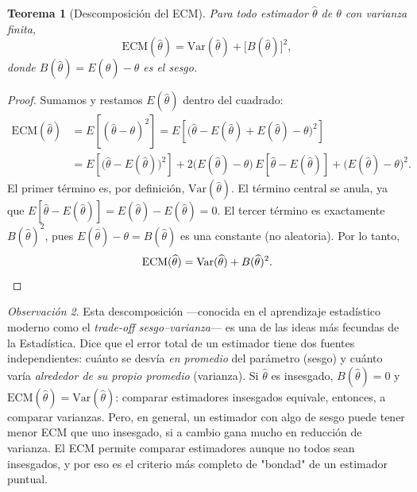 \documentclass[11pt,a4paper]{article}
\theoremstyle{plain}
\newtheorem{teorema}{Teorema}[section]
\theoremstyle{definition}
\theoremstyle{remark}
\newtheorem{observacion}[teorema]{Observación}
\begin{document}
\begin{teorema}[Descomposición del ECM]\label{teo:ecm}
Para todo estimador $\widehat\theta$ de $\theta$ con varianza finita,
\[
\mathrm{ECM}(\widehat\theta) = \mathrm{Var}(\widehat\theta) + \big[B(\widehat\theta)\big]^2,
\]
donde $B(\widehat\theta)=E(\widehat\theta)-\theta$ es el sesgo.
\end{teorema}

\begin{proof}
Sumamos y restamos $E(\widehat\theta)$ dentro del cuadrado:
\begin{align*}
\mathrm{ECM}(\widehat\theta) &= E\left[(\widehat\theta-\theta)^2\right] = E\left[\Big(\widehat\theta - E(\widehat\theta) + E(\widehat\theta)-\theta\Big)^2\right]\\
&= E\left[\big(\widehat\theta-E(\widehat\theta)\big)^2\right] + 2\big(E(\widehat\theta)-\theta\big)\,E\left[\widehat\theta-E(\widehat\theta)\right] + \big(E(\widehat\theta)-\theta\big)^2.
\end{align*}
El primer término es, por definición, $\mathrm{Var}(\widehat\theta)$. El término central se anula, ya que $E[\widehat\theta-E(\widehat\theta)] = E(\widehat\theta)-E(\widehat\theta)=0$. El tercer término es exactamente $B(\widehat\theta)^2$, pues $E(\widehat\theta)-\theta=B(\widehat\theta)$ es una constante (no aleatoria). Por lo tanto,
\[
\mathrm{ECM}(\widehat\theta) = \mathrm{Var}(\widehat\theta) + B(\widehat\theta)^2. \qedhere
\]
\end{proof}

\begin{observacion}
Esta descomposición —conocida en el aprendizaje estadístico moderno como el \emph{trade-off sesgo--varianza}— es una de las ideas más fecundas de la Estadística. Dice que el error total de un estimador tiene dos fuentes independientes: cuánto se desvía \emph{en promedio} del parámetro (sesgo) y cuánto varía \emph{alrededor de su propio promedio} (varianza). Si $\widehat\theta$ es insesgado, $B(\widehat\theta)=0$ y $\mathrm{ECM}(\widehat\theta)=\mathrm{Var}(\widehat\theta)$: comparar estimadores insesgados equivale, entonces, a comparar varianzas. Pero, en general, un estimador con algo de sesgo puede tener menor ECM que uno insesgado, si a cambio gana mucho en reducción de varianza. El ECM permite comparar estimadores aunque no todos sean insesgados, y por eso es el criterio más completo de "bondad" de un estimador puntual.
\end{observacion}
\end{document}

